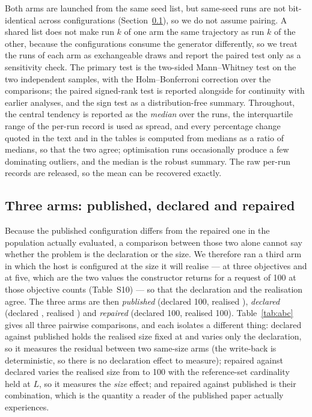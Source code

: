 \documentclass{SCIS2026}
\begin{document}
Both arms are launched from the same seed list, but same-seed runs are not bit-identical across configurations (Section~\ref{sec:abc}), so we do not assume pairing. A shared list does not make run $k$ of one arm the same trajectory as run $k$ of the other, because the configurations consume the generator differently, so we treat the runs of each arm as exchangeable draws and report the paired test only as a sensitivity check. The primary test is the two-sided Mann--Whitney test on the two independent samples, with the Holm--Bonferroni correction over the \nProbs{} comparisons; the paired signed-rank test is reported alongside for continuity with earlier analyses, and the sign test as a distribution-free summary. Throughout, the central tendency is reported as the \emph{median} over the runs, the interquartile range of the per-run record is used as spread, and every percentage change quoted in the text and in the tables is computed from medians as a ratio of medians, so that the two agree; optimisation runs occasionally produce a few dominating outliers, and the median is the robust summary. The raw per-run records are released, so the mean can be recovered exactly.

\subsection{Three arms: published, declared and repaired}
\label{sec:abc}
Because the published configuration differs from the repaired one in the population actually evaluated, a comparison between those two alone cannot say whether the problem is the declaration or the size. We therefore ran a third arm in which the host is configured at the size it will realise --- \retMthree{} at three objectives and \retMfive{} at five, which are the two values the constructor returns for a request of 100 at those objective counts (Table~S10) --- so that the declaration and the realisation agree. The three arms are then \emph{published} (declared 100, realised \retMthree{}), \emph{declared} (declared \retMthree{}, realised \retMthree{}) and \emph{repaired} (declared 100, realised 100). Table~\ref{tab:abc} gives all three pairwise comparisons, and each isolates a different thing: declared against published holds the realised size fixed at \retMthree{} and varies only the declaration, so it measures the residual between two same-size arms (the write-back is deterministic, so there is no declaration effect to measure); repaired against declared varies the realised size from \retMthree{} to 100 with the reference-set cardinality held at $L$, so it measures the \emph{size} effect; and repaired against published is their combination, which is the quantity a reader of the published paper actually experiences.
\end{document}
